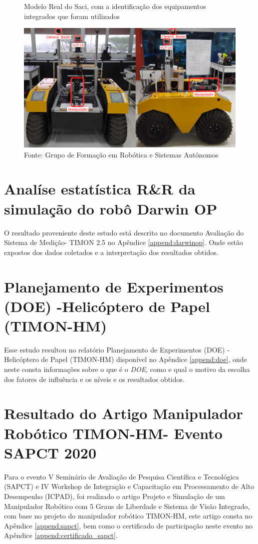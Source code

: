 \begin{figure}[H]
    \caption{Modelo Real do Saci, com a identificação dos equipamentos integrados que foram utilizados}
    \centering
    \includegraphics[width= \textwidth]{Figures/warthog_compo2.png}
    \caption*{Fonte: Grupo de Formação em Robótica e Sistemas Autônomos}
    \label{fig:warthog_desafio_3}
\end{figure}


\section{Analíse estatística R\&R da simulação do robô Darwin OP }
\label{sec:analise_darwin}
O resultado proveniente deste estudo está descrito no documento Avaliação do Sistema de Medição- TIMON 2.5 no Apêndice \ref{append:darwinop}. Onde estão expostos dos dados coletados e a interpretação dos resultados obtidos.


\section{Planejamento de Experimentos (DOE) -Helicóptero de Papel (TIMON-HM)}
\label{sec:analise_doe}
Esse estudo resultou no relatório Planejamento de Experimentos (DOE) -Helicóptero de Papel (TIMON-HM) disponível no Apêndice \ref{append:doe}, onde neste consta informações sobre o que é o \textit{DOE}, como e qual o motivo da escolha dos fatores de influência e os níveis e os resultados obtidos. 

\section{Resultado do Artigo Manipulador Robótico TIMON-HM- Evento SAPCT 2020 }
\label{sec:sapct}
Para o evento V Seminário de Avaliação de Pesquisa Científica e Tecnológica (SAPCT) e IV Workshop de Integração e Capacitação em Processamento de Alto Desempenho (ICPAD), foi realizado o artigo Projeto e Simulação de um Manipulador Robótico com 5 Graus de Liberdade e Sistema de Visão Integrado, com base no projeto do manipulador robótico TIMON-HM, este artigo consta no Apêndice \ref{append:sapct}, bem como o certificado de participação neste evento no Apêndice \ref{append:certificado_sapct}.


